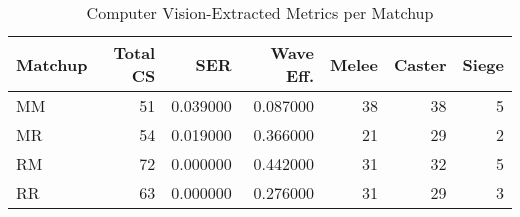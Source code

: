 \begin{table}
\caption{Computer Vision-Extracted Metrics per Matchup}
\label{tab:video_cognitive_metrics}
\begin{tabular}{lrrrrrr}
\toprule
Matchup & Total CS & SER & Wave Eff. & Melee & Caster & Siege \\
\midrule
MM & 51 & 0.039000 & 0.087000 & 38 & 38 & 5 \\
MR & 54 & 0.019000 & 0.366000 & 21 & 29 & 2 \\
RM & 72 & 0.000000 & 0.442000 & 31 & 32 & 5 \\
RR & 63 & 0.000000 & 0.276000 & 31 & 29 & 3 \\
\bottomrule
\end{tabular}
\end{table}
